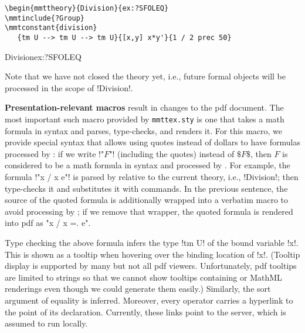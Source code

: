 \begin{lstlisting}
\begin{mmttheory}{Division}{ex:?SFOLEQ}
\mmtinclude{?Group}
\mmtconstant{division}
   {tm U --> tm U --> tm U}{[x,y] x*y'}{1 / 2 prec 50}
\end{lstlisting}

\begin{mmttheory}{Division}{ex:?SFOLEQ}

\noindent
Note that we have not closed the theory yet, i.e., future formal objects will be processed in the scope of !Division!.
\medskip

\textbf{Presentation-relevant macros} result in changes to the pdf document.
The most important such macro provided by \texttt{mmttex.sty} is one that takes a math formula in \mmt syntax and parses, type-checks, and renders it.
For this macro, we provide special syntax that allows using quotes instead of dollars to have formulas processed by \mmt:
if we write !"$F$"! (including the quotes) instead of $\mathdollar F\mathdollar$, then $F$ is considered to be a math formula in \mmt syntax and processed by \mmt.
For example, the formula !"\forall [x] x / x \doteq e"! is parsed by \mmt relative to the current theory, i.e., !Division!; then \mmt type-checks it and substitutes it with \latex commands. In the previous sentence, the \latex source of the quoted formula is additionally wrapped into a verbatim macro to avoid processing by \mmt; if we remove that wrapper, the quoted formula is rendered into pdf as "\forall [x] x / x =. e".

Type checking the above formula infers the type !tm U! of the bound variable !x!.
This is shown as a tooltip when hovering over the binding location of !x!.
(Tooltip display is supported by many but not all pdf viewers.
Unfortunately, pdf tooltips  are limited to strings so that we cannot show tooltips containing \latex or MathML renderings even though we could generate them easily.)
Similarly, the sort argument of equality is inferred.
Moreover, every operator carries a hyperlink to the point of its declaration.
Currently, these links point to the \mmt server, which is assumed to run locally.
\medskip


\end{mmttheory}
